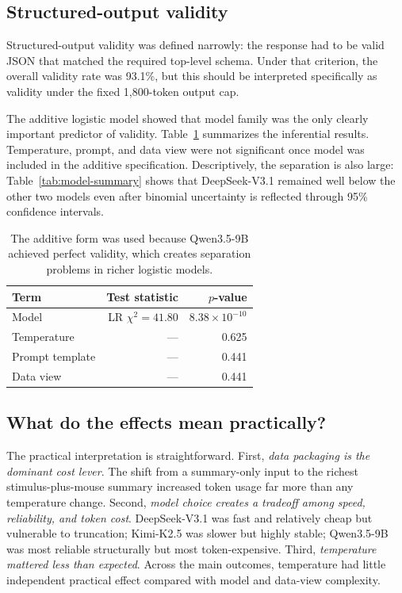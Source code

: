 \documentclass{article}
\begin{document}
\subsection{Structured-output validity}

Structured-output validity was defined narrowly: the response had to be valid JSON that matched the required top-level schema. Under that criterion, the overall validity rate was 93.1\%, but this should be interpreted specifically as validity under the fixed 1{,}800-token output cap.

The additive logistic model showed that model family was the only clearly important predictor of validity. Table~\ref{tab:validity-model} summarizes the inferential results. Temperature, prompt, and data view were not significant once model was included in the additive specification. Descriptively, the separation is also large: Table~\ref{tab:model-summary} shows that DeepSeek-V3.1 remained well below the other two models even after binomial uncertainty is reflected through 95\% confidence intervals.

\begin{table}[tbp]
\centering
\caption{Additive logistic model summary for valid JSON}
\label{tab:validity-model}
\small
\begin{tabular}{lrr}
\toprule
Term & Test statistic & $p$-value \\
\midrule
Model & LR $\chi^2 = 41.80$ & $8.38\times10^{-10}$ \\
Temperature & --- & 0.625 \\
Prompt template & --- & 0.441 \\
Data view & --- & 0.441 \\
\bottomrule
\end{tabular}
\caption*{\footnotesize The additive form was used because Qwen3.5-9B achieved perfect validity, which creates separation problems in richer logistic models.}
\end{table}

\subsection{What do the effects mean practically?}

The practical interpretation is straightforward. First, \emph{data packaging is the dominant cost lever}. The shift from a summary-only input to the richest stimulus-plus-mouse summary increased token usage far more than any temperature change. Second, \emph{model choice creates a tradeoff among speed, reliability, and token cost}. DeepSeek-V3.1 was fast and relatively cheap but vulnerable to truncation; Kimi-K2.5 was slower but highly stable; Qwen3.5-9B was most reliable structurally but most token-expensive. Third, \emph{temperature mattered less than expected}. Across the main outcomes, temperature had little independent practical effect compared with model and data-view complexity.
\end{document}
